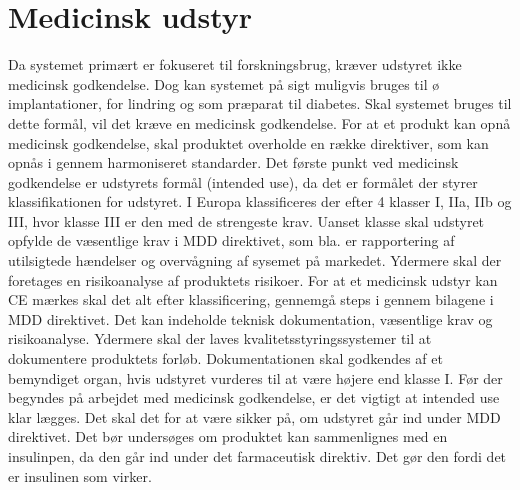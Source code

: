 \section{Medicinsk udstyr}
 Da systemet primært er fokuseret til forskningsbrug, kræver udstyret ikke medicinsk godkendelse. Dog kan systemet på sigt muligvis bruges til ø implantationer, for lindring og som præparat til diabetes. Skal systemet bruges til dette formål, vil det kræve en medicinsk godkendelse. For at et produkt kan opnå medicinsk godkendelse, skal produktet overholde en række direktiver, som kan opnås i gennem harmoniseret standarder. Det første punkt ved medicinsk godkendelse er udstyrets formål (intended use), da det er formålet der styrer klassifikationen for udstyret. I Europa klassificeres der efter 4 klasser I, IIa, IIb og III, hvor klasse III er den med de strengeste krav. Uanset klasse skal udstyret opfylde de væsentlige krav i MDD direktivet, som bla. er rapportering af utilsigtede hændelser og overvågning af sysemet på markedet. Ydermere skal der foretages en risikoanalyse af produktets risikoer. For at et medicinsk udstyr kan CE mærkes skal det alt efter klassificering, gennemgå steps i gennem bilagene i MDD direktivet. Det kan indeholde teknisk dokumentation, væsentlige krav og risikoanalyse. Ydermere skal der laves kvalitetsstyringssystemer til at dokumentere produktets forløb. Dokumentationen skal godkendes af et bemyndiget organ, hvis udstyret vurderes til at være højere end klasse I. Før der begyndes på arbejdet med medicinsk godkendelse, er det vigtigt at intended use klar lægges. Det skal det for at være sikker på, om udstyret går ind under MDD direktivet. Det bør undersøges om produktet kan sammenlignes med en insulinpen, da den går ind under det farmaceutisk direktiv. Det gør den fordi det er insulinen som virker. 